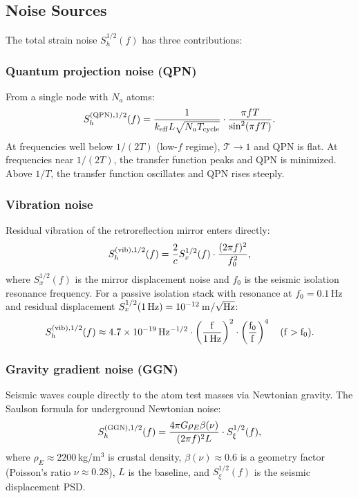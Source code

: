 \documentclass[11pt]{article}
\theoremstyle{definition}
\theoremstyle{remark}
\begin{document}
\subsection{Noise Sources}

The total strain noise $S_h^{1/2}(f)$ has three contributions:

\subsubsection{Quantum projection noise (QPN)}

From a single node with $N_a$ atoms:
\begin{equation}
S_h^{(\rm QPN),1/2}(f) = \frac{1}{k_{\rm eff} L \sqrt{N_a T_{\rm cycle}}}
\cdot \frac{\pi f T}{\sin^2(\pi f T)}.
\label{eq:qpn}
\end{equation}
At frequencies well below $1/(2T)$ (low-$f$ regime), $\mathcal{T} \to 1$
and QPN is flat. At frequencies near $1/(2T)$, the transfer function peaks
and QPN is minimized. Above $1/T$, the transfer function oscillates and QPN
rises steeply.

\subsubsection{Vibration noise}

Residual vibration of the retroreflection mirror enters directly:
\begin{equation}
S_h^{(\rm vib),1/2}(f) = \frac{2}{c} S_x^{1/2}(f) \cdot \frac{(2\pi f)^2}{f_0^2},
\end{equation}
where $S_x^{1/2}(f)$ is the mirror displacement noise and $f_0$ is the
seismic isolation resonance frequency. For a passive isolation stack with
resonance at $f_0 = 0.1$\,Hz and residual displacement $S_x^{1/2}(1\,\rm Hz)
= 10^{-12}$\,m$/\sqrt{\rm Hz}$:
\begin{equation}
S_h^{(\rm vib),1/2}(f) \approx 4.7\times10^{-19}\,\rm Hz^{-1/2}
\cdot \left(\frac{f}{1\,\rm Hz}\right)^2
\cdot \left(\frac{f_0}{f}\right)^4
\quad (f > f_0).
\end{equation}

\subsubsection{Gravity gradient noise (GGN)}

Seismic waves couple directly to the atom test masses via Newtonian gravity.
The Saulson formula for underground Newtonian noise:
\begin{equation}
S_h^{(\rm GGN),1/2}(f) = \frac{4\pi G \rho_E \beta(\nu)}{(2\pi f)^2 L}
\cdot S_\xi^{1/2}(f),
\label{eq:ggn}
\end{equation}
where $\rho_E \approx 2200$\,kg/m$^3$ is crustal density, $\beta(\nu)
\approx 0.6$ is a geometry factor (Poisson's ratio $\nu \approx 0.28$),
$L$ is the baseline, and $S_\xi^{1/2}(f)$ is the seismic displacement PSD.
\end{document}

